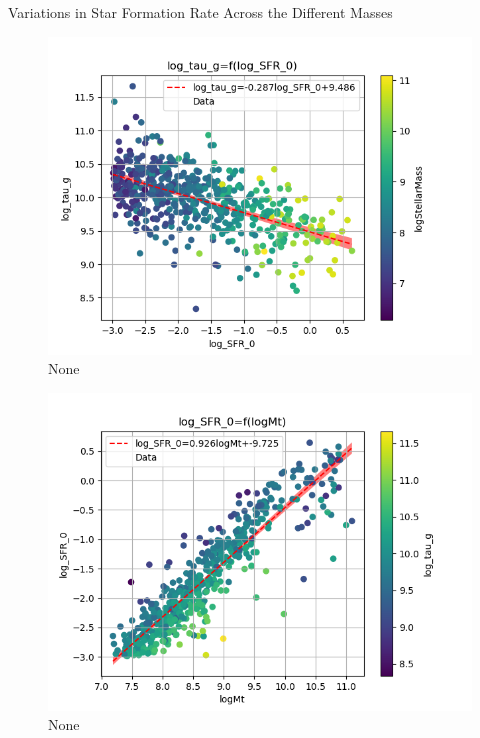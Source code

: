 \documentclass[presentation]{beamer}
\begin{document}
\begin{frame}[label={sec:orgbd7dd9c}]{Variations in Star Formation Rate Across the Different Masses}
\begin{figure}[!htpb]
\centering
\includegraphics[width=.9\linewidth]{./figs/log_SFR_0-log_tau_g-color_logStellarMass.png}
\caption{\label{fig:None}None}
\end{figure}

\begin{figure}[!htpb]
\centering
\includegraphics[width=.9\linewidth]{./figs/logMt-log_SFR_0-color_log_tau_g.png}
\caption{\label{fig:None}None}
\end{figure}


\end{frame}
\end{document}
